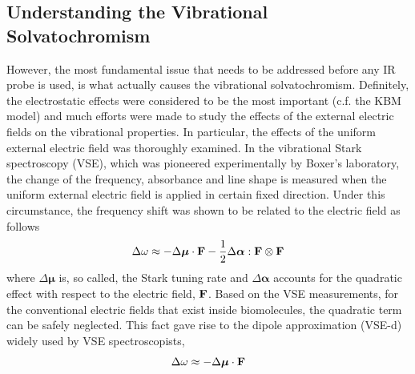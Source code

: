 \documentclass[a4paper,titlepage,twoside,fleqn,12pt]{book}
\newcommand{\BM}[1]{\bm{#1}}
\begin{document}
\begin{refsection}
\section{Understanding the Vibrational Solvatochromism}
%
However, the most fundamental issue that needs to be addressed 
before any IR probe is used, is what actually causes the vibrational solvatochromism.
Definitely, the electrostatic effects were considered to be the most important
(c.f. the KBM model) and much efforts were made to study the effects of the external
electric fields on the vibrational properties.\citep{Kim.Cho.ChemRev.2013} 
In particular, the effects of the
uniform external electric field was thoroughly examined.\citep{Hush.Reimers.JPC.1995,
Reimers.Zeng.Hush.JPC.1996,Andrews.Boxer.JCPA.2002,Cho.JCP.2009} 
In the vibrational Stark spectroscopy (VSE)\citep{Hush.Reimers.JPC.1995,Reimers.Zeng.Hush.JPC.1996}, 
which was pioneered experimentally by Boxer's laboratory\citep{Bublitz.Boxer.AnnuRevPhysChem.1997}, 
the change of the frequency, absorbance
and line shape is measured when the uniform external electric field is applied in certain fixed direction.
Under this circumstance, the frequency shift
was shown to be related to the electric field as follows\citep{Hush.Reimers.JPC.1995,Reimers.Zeng.Hush.JPC.1996}
%
\begin{equation} \label{e:vse-shift-full}
 \Delta \omega \approx - \Delta {\BM \mu} \cdot {\bf F} - \frac{1}{2} \Delta {\BM \alpha} : {\bf F} \otimes {\bf F}
\end{equation}
%
where $\Delta {\BM \mu}$ is, so called, the Stark tuning rate
and $\Delta {\BM \alpha}$ accounts for the quadratic effect with respect to 
the electric field, ${\bf F}$. 
Based on the VSE measurements, for the conventional
electric fields that exist inside biomolecules, the quadratic term
can be safely neglected. 
This fact gave rise to the dipole approximation (VSE-d)
widely used by VSE spectroscopists,
%
\begin{equation} \label{e:vse-shift-dipole}
 \Delta \omega \approx - \Delta {\BM \mu} \cdot {\bf F}

\end{equation}
\end{refsection}
\end{document}
